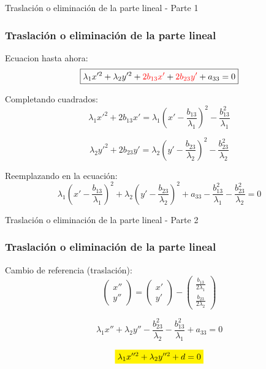 \documentclass[xcolor={dvipsnames},aspectratio=169,10pt]{beamer}
\begin{document}
\begin{frame}{Traslación o eliminación de la parte lineal - Parte 1}
  \frametitle{Traslación o eliminación de la parte lineal}
  Ecuacion hasta ahora:
  \begin{equation*}
    \boxed{\lambda_1x'^2 + \lambda_2y'^2 + \textcolor{red}{2b_{13}x'} + \textcolor{red}{2b_{23}y'} + a_{33} = 0}
  \end{equation*}

  Completando cuadrados:
  \begin{equation*}
    \lambda_{1}x'^2 + 2b_{13}x' = \lambda_{1}\left(x' - \frac{b_{13}}{\lambda_{1}}\right)^2 - \frac{b_{13}^2}{\lambda_{1}}
  \end{equation*}
  
  \begin{equation*}
    \lambda_{2}y'^2 + 2b_{23}y' = \lambda_{2}\left(y' - \frac{b_{23}}{\lambda_{2}}\right)^2 - \frac{b_{23}^2}{\lambda_{2}}
  \end{equation*}

  Reemplazando en la ecuación:
  \begin{equation*}
    \boxed{\lambda_{1}\left(x' - \frac{b_{13}}{\lambda_{1}}\right)^2 + \lambda_{2}\left(y' - \frac{b_{23}}{\lambda_{2}}\right)^2 + a_{33} - \frac{b_{13}^2}{\lambda_{1}} - \frac{b_{23}^2}{\lambda_{2}} = 0}
  \end{equation*}

\end{frame}

\begin{frame}{Traslación o eliminación de la parte lineal - Parte 2}
  \frametitle{Traslación o eliminación de la parte lineal}

  Cambio de referencia (traslación):
  \begin{equation*}
    \begin{pmatrix} x'' \\ y'' \end{pmatrix} = \begin{pmatrix} x' \\ y' \end{pmatrix} - \begin{pmatrix} \frac{b_{13}}{2\lambda_{1}} \\ \frac{b_{23}}{2\lambda_{2}} \end{pmatrix}
  \end{equation*}

  \begin{equation*}
    \lambda_{1}x''+ \lambda_{2}y'' - \frac{b_{23}^2}{\lambda_{2}}  - \frac{b_{13}^2}{\lambda_{1}}  + a_{33} = 0
  \end{equation*}

  \begin{equation*}
    \colorbox{yellow}{$\displaystyle\lambda_{1}x''^2 + \lambda_{2}y''^2 + d = 0$}
  \end{equation*}
\end{frame}
\end{document}
